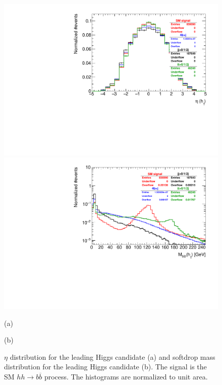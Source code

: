 \begin{figure}
	\centering
	\begin{minipage}{.5\textwidth}
		\centering
		\includegraphics[trim={.65cm 0 0 0},clip,width=\linewidth]{./Figures/hist_h1_eta.pdf}
	\end{minipage}%
	\begin{minipage}{.5\textwidth}
		\centering
		\includegraphics[trim={0 0 .65cm 0},clip,width=\linewidth]{./Figures/hist_h1_softdrop_M.pdf}
	\end{minipage}
	\begin{minipage}[t]{0.5\textwidth}
		\caption*{(a)}
	\end{minipage}%
	\hfill
	\begin{minipage}[t]{0.5\textwidth}
		\caption*{(b)}
	\end{minipage}
	\caption{$\eta$ distribution for the leading Higgs candidate (a) and softdrop mass distribution for the leading Higgs candidate (b). The signal is the SM $hh\rightarrow b\overline{b}$ process. The histograms are normalized to unit area.}
	\label{fig:h1_eta_M}
\end{figure}	

